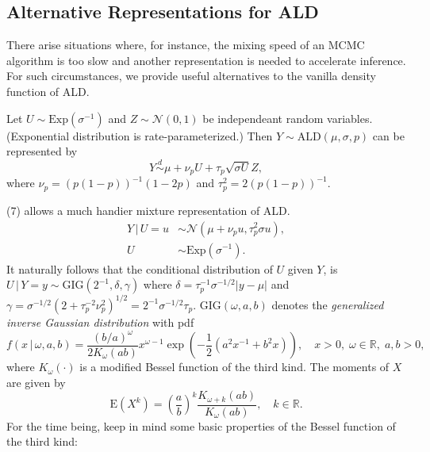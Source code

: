 \documentclass[12pt]{article}
\begin{document}
\subsection{Alternative Representations for ALD}
There arise situations where, for instance, the mixing speed of an MCMC algorithm is too slow and another representation is needed to accelerate inference. For such circumstances, we provide useful alternatives to the vanilla density function of ALD. \par
Let $U \sim \mathrm{Exp}\left(\sigma^{-1}\right)$ and $Z \sim \mathcal{N}\left(0,1\right)$ be independeant random variables. (Exponential distribution is rate-parameterized.) Then $Y \sim \mathrm{ALD}\left(\mu, \sigma, p\right)$ can be represented by
\begin{equation}
  Y \overset{d}{\sim} \mu + \nu_{p}U + \tau_{p}\sqrt{\sigma U}Z,
\end{equation}
where $\nu_{p}=\left(p\left(1-p\right)\right)^{-1}\left(1-2p\right)$ and $\tau_{p}^{2} = 2\left(p\left(1-p\right)\right)^{-1}$. \par
(7) allows a much handier mixture representation of ALD.
\begin{align*}
  Y\,|\,U=u &\sim \mathcal{N}\left(\mu + \nu_{p}u, \tau_{p}^{2}\sigma u\right),\\
  U &\sim \mathrm{Exp}\left(\sigma^{-1}\right).
\end{align*}
It naturally follows that the conditional distribution of $U$ given $Y$, is $U\,|\,Y=y \sim \mathrm{GIG}\left(2^{-1}, \delta, \gamma\right)$ where $\delta =\tau_{p}^{-1}\sigma^{-1/2}\left|y-\mu\right|$ and $\gamma =\sigma^{-1/2}\left(2+\tau_{p}^{-2}\nu_{p}^{2}\right)^{1/2}=2^{-1}\sigma^{-1/2}\tau_{p}$. $\mathrm{GIG}\left(\omega, a, b\right)$ denotes the \emph{generalized inverse Gaussian distribution} with pdf
\begin{equation}
  f\left(x\,|\,\omega, a, b\right) = \frac{\left(b/a\right)^{\omega}}{2K_{\omega}\left(ab\right)}x^{\omega-1}\exp\left(-\frac{1}{2}\left(a^{2}x^{-1}+b^{2}x\right)\right), \quad x>0,\; \omega\in \mathbb{R}, \; a,b>0,
\end{equation}
where $K_{\omega}\left(\cdot\right)$ is a modified Bessel function of the third kind. The moments of $X$ are given by
\begin{equation}
  \mathrm{E}\left(X^{k}\right) = \left(\frac{a}{b}\right)^{k}\frac{K_{\omega+k}\left(ab\right)}{K_{\omega}\left(ab\right)},\quad k\in\mathbb{R}.
\end{equation}
For the time being, keep in mind some basic properties of the Bessel function of the third kind:
\end{document}
